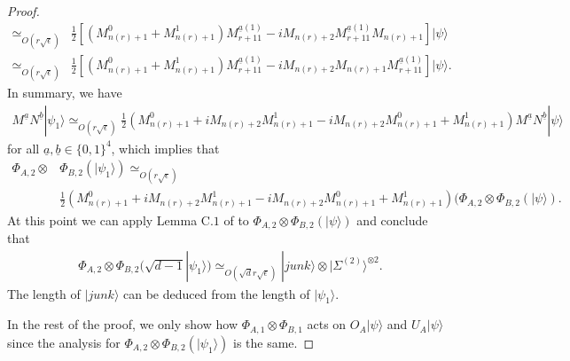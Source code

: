 \documentclass[11pt,letterpaper]{article}
\newcommand{\ket}[1]{|#1\rangle}
\newcommand{\x}{\otimes}
\newcommand{\1}{\mathbb{1}}
\newcommand{\EPR}[1]{\Sigma^{(#1)}}
\newcommand{\nr}{n(r)}
\newcommand{\ua}{\underline{a}}
\newcommand{\ub}{\underline{b}}
\newcommand{\se}{\sqrt{\epsilon}}
\newcommand{\sd}{\sqrt{d}}
\newcommand{\appd}[1]{\simeq_{#1}}
\theoremstyle{definition}
\begin{document}
\begin{proof}
\begin{align}
	\appd{O(r\se)}&\frac{1}{2} [(M_{\nr+1}^0+M_{\nr+1}^1) M_{r+11}^{\ua(1)} - iM_{\nr+2}M_{r+11}^{\ua(1)} M_{\nr+1}] \ket{\psi} \\
	\appd{O(r\se)}&\frac{1}{2} [(M_{\nr+1}^0+M_{\nr+1}^1) M_{r+11}^{\ua(1)} - iM_{\nr+2}M_{\nr+1}M_{r+11}^{\ua(1)} ] \ket{\psi}.
\end{align}
In summary, we have 
\begin{align}
	M^{\ua} N^{\ub} \ket{\psi_1} \appd{O(r\se)} \frac{1}{2} (M_{\nr+1}^0 + iM_{\nr+2}M_{\nr+1}^1 - iM_{\nr+2}M_{\nr+1}^0 + M_{\nr+1}^1)M^{\ua}N^{\ub} \ket{\psi}
\end{align}
for all $\ua, \ub \in \{0,1\}^4$, which implies that 
\begin{align}
	\Phi_{A,2} \x& \Phi_{B,2}(\ket{\psi_1}) \appd{O(r\se)}\\
	 &\frac{1}{2} (M_{\nr+1}^0 + iM_{\nr+2}M_{\nr+1}^1 - iM_{\nr+2}M_{\nr+1}^0 + M_{\nr+1}^1)(\Phi_{A,2}\x\Phi_{B,2} (\ket{\psi}).
\end{align}
At this point we can apply Lemma C.$1$ of \cite{wu2016} to $\Phi_{A,2}\x\Phi_{B,2} (\ket{\psi})$ and conclude that 
\begin{align}
	\Phi_{A,2} \x \Phi_{B,2}(\sqrt{d-1} \ket{\psi_1}) \appd{O(\sd r \se)} \ket{junk} \x \ket{\EPR{2}}^{\x 2}.
\end{align} 
The length of $\ket{junk}$ can be deduced from the length of $\ket{\psi_1}$.

In the rest of the proof, we only show how $\Phi_{A,1} \x \Phi_{B,1}$ acts on $O_A\ket{\psi}$ and $U_A\ket{\psi}$ since the analysis for 
$\Phi_{A,2} \x \Phi_{B,2}(\ket{\psi_1})$ is the same.


\end{proof}
\end{document}
